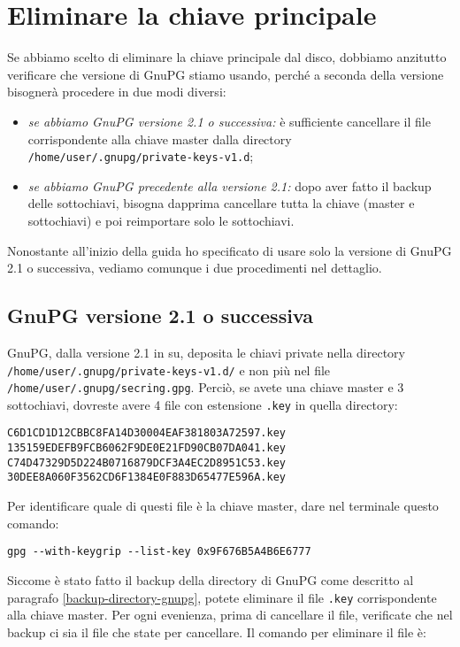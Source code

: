 \chapter{Eliminare la chiave principale}

Se abbiamo scelto di eliminare la chiave principale dal disco, dobbiamo
anzitutto verificare che versione di GnuPG stiamo usando, perché a seconda della
versione bisognerà procedere in due modi diversi:

\begin{itemize}
   \item \emph{se abbiamo GnuPG versione 2.1 o successiva:} è sufficiente
   cancellare il file corrispondente alla chiave master dalla directory
   \texttt{/home/user/.gnupg/private-keys-v1.d};
   \item \emph{se abbiamo GnuPG precedente alla versione 2.1:} dopo aver fatto
   il backup delle sottochiavi, bisogna dapprima cancellare tutta la chiave
   (master e sottochiavi) e poi reimportare solo le sottochiavi.
\end{itemize}

Nonostante all'inizio della guida ho specificato di usare solo la versione di
GnuPG 2.1 o successiva, vediamo comunque i due procedimenti nel dettaglio.

\section{GnuPG versione 2.1 o successiva}

GnuPG, dalla versione 2.1 in su, deposita le chiavi private nella directory
\texttt{/home/user/.gnupg/private-keys-v1.d/} e non più nel file
\texttt{/home/user/.gnupg/secring.gpg}. Perciò, se avete una chiave master e 3
sottochiavi, dovreste avere 4 file con estensione \texttt{.key} in quella
directory:

\begin{lstlisting}
C6D1CD1D12CBBC8FA14D30004EAF381803A72597.key
135159EDEFB9FCB6062F9DE0E21FD90CB07DA041.key
C74D47329D5D224B0716879DCF3A4EC2D8951C53.key
30DEE8A060F3562CD6F1384E0F883D65477E596A.key
\end{lstlisting}

Per identificare quale di questi file è la chiave master, dare nel terminale
questo comando:

\begin{lstlisting}
gpg --with-keygrip --list-key 0x9F676B5A4B6E6777
\end{lstlisting}

Siccome è stato fatto il backup della directory di GnuPG come descritto al
paragrafo \vref{backup-directory-gnupg}, potete eliminare il file \texttt{.key}
corrispondente alla chiave master. Per ogni evenienza, prima di cancellare il
file, verificate che nel backup ci sia il file che state per cancellare. Il
comando per eliminare il file è:

